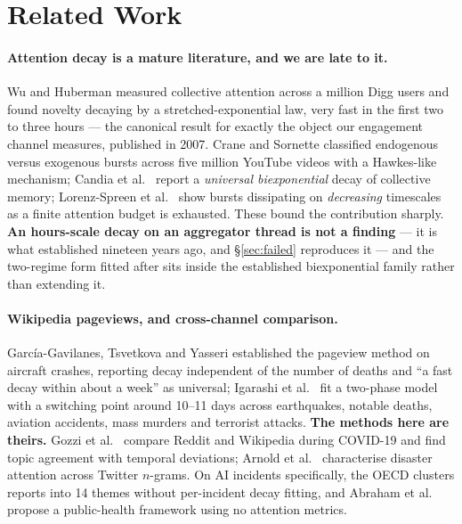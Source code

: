 \documentclass[11pt,a4paper]{article}
\begin{document}
\section{Related Work}
\label{sec:related}

\paragraph{Attention decay is a mature literature, and we are late to it.}
Wu and Huberman \cite{wu2007novelty} measured collective attention across a
million Digg users and found novelty decaying by a stretched-exponential law,
very fast in the first two to three hours --- the canonical result for exactly
the object our engagement channel measures, published in 2007. Crane and
Sornette \cite{crane2008robust} classified endogenous versus exogenous bursts
across five million YouTube videos with a Hawkes-like mechanism; Candia et al.\
\cite{candia2019universal} report a \emph{universal biexponential} decay of
collective memory; Lorenz-Spreen et al.\ \cite{lorenzspreen2019accelerating}
show bursts dissipating on \emph{decreasing} timescales as a finite attention
budget is exhausted. These bound the contribution sharply. \textbf{An
hours-scale decay on an aggregator thread is not a finding} --- it is what
\cite{wu2007novelty} established nineteen years ago, and §\ref{sec:failed}
reproduces it --- and the two-regime form fitted after
\cite{igarashi2022twophase} sits inside the established biexponential family
rather than extending it.

\paragraph{Wikipedia pageviews, and cross-channel comparison.}
Garc\'ia-Gavilanes, Tsvetkova and Yasseri \cite{garciagavilanes2016crashes}
established the pageview method on aircraft crashes, reporting decay
independent of the number of deaths and ``a fast decay within about a week'' as
universal; Igarashi et al.\ \cite{igarashi2022twophase} fit a two-phase model
with a switching point around 10--11 days across earthquakes, notable deaths,
aviation accidents, mass murders and terrorist attacks. \textbf{The methods
here are theirs.} Gozzi et al.\ \cite{gozzi2020covid} compare Reddit and
Wikipedia during COVID-19 and find topic agreement with temporal deviations;
Arnold et al.\ \cite{arnold2020hurricanes} characterise disaster attention
across Twitter $n$-grams. On AI incidents specifically, the OECD
\cite{oecd2026trends} clusters reports into 14 themes without per-incident decay
fitting, and Abraham et al.\ \cite{abraham2026publichealth} propose a
public-health framework using no attention metrics.
\end{document}
